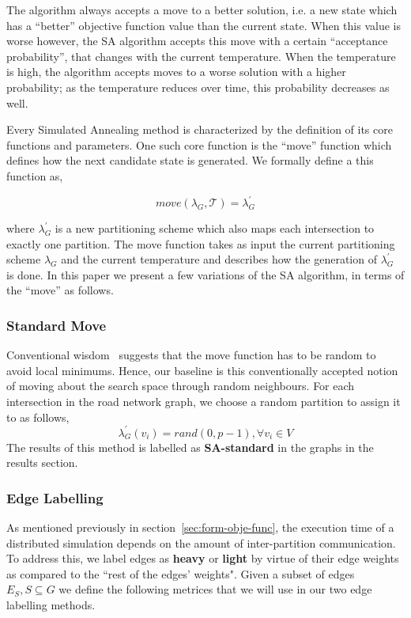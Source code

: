 The algorithm always accepts a move to a better solution, i.e. a new state which has a ``better'' objective function value than the current state. When this value is worse however, the SA algorithm accepts this move with a certain ``acceptance probability'', that changes with the current temperature. When the temperature is high, the algorithm accepts moves to a worse solution with a higher probability; as the temperature reduces over time, this probability decreases as well.

 Every Simulated Annealing method is characterized by the definition of its core functions and parameters. One such core function is the ``move'' function which defines how the next candidate state is generated. We formally define a this function as,

\begin{equation}
\label{eq:move-func}
move(\lambda_G, \mathcal{T}) =  \lambda_G^{'}
\end{equation}

\noindent where $\lambda_G^{'}$ is a new partitioning scheme which also maps each intersection to exactly one partition. The move function takes as input the current partitioning scheme $\lambda_G$ and the current temperature and describes how the generation of $\lambda_G^{'}$ is done. In this paper we present a few variations of the SA algorithm, in terms of the ``move'' as follows.

\subsubsection{Standard Move}
\label{sec:opti-std}
Conventional wisdom~\cite{orsila2006parameterizing} suggests that the move function has to be random to avoid local minimums. Hence, our baseline is this conventionally accepted notion of moving about the search space through random neighbours. For each intersection in the road network graph, we choose a random partition to assign it to as follows,
\begin{equation}
\label{eq:std-move}
\lambda_G^{'}(v_i) = rand(0, p-1), \forall v_i \in V
\end{equation}
\noindent The results of this method is labelled as \textbf{SA-standard} in the graphs in the results section.

\subsubsection{Edge Labelling}
\label{sec:opti-glob-edge}
As mentioned previously in section~\ref{sec:form-obje-func}, the execution time of a distributed simulation depends on the amount of inter-partition communication. To address this, we label edges as \textbf{heavy} or \textbf{light} by virtue of their edge weights as compared to the ``rest of the edges' weights". Given a subset of edges $E_S, S \subseteq G$ we define the following metrices that we will use in our two edge labelling methods.

